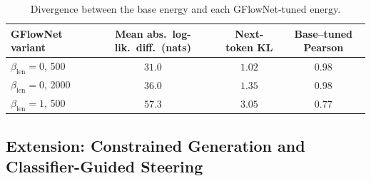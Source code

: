 \begin{table}[htbp]
    \centering
    \small
    \setlength{\tabcolsep}{4pt}
    \begin{tabular}{lccc}
        \toprule
        GFlowNet variant & Mean abs.\ log-lik.\ diff.\ (nats) & Next-token KL & Base--tuned Pearson \\
        \midrule
        $\beta_{\text{len}} = 0$, 500  & $31.0$ & $1.02$ & $0.98$ \\
        $\beta_{\text{len}} = 0$, 2000 & $36.0$ & $1.35$ & $0.98$ \\
        $\beta_{\text{len}} = 1$, 500  & $57.3$ & $3.05$ & $0.77$ \\
        \bottomrule
    \end{tabular}
    \caption[Divergence between the base and GFlowNet-tuned energies.]{Divergence between the base energy and each GFlowNet-tuned energy.}
    \label{tab:divergence}
\end{table}

\subsection{Extension: Constrained Generation and Classifier-Guided Steering}
\label{sec:results-constrained}

